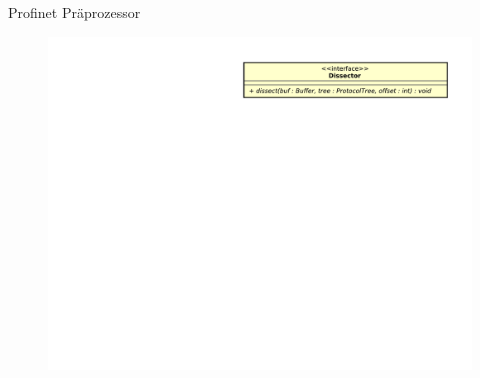\begin{frame}{Profinet Präprozessor}
    \begin{figure}
    	\centering
    	\includegraphics[width=\textwidth]{./images/dissector/1.pdf}
    \end{figure}
\end{frame}
